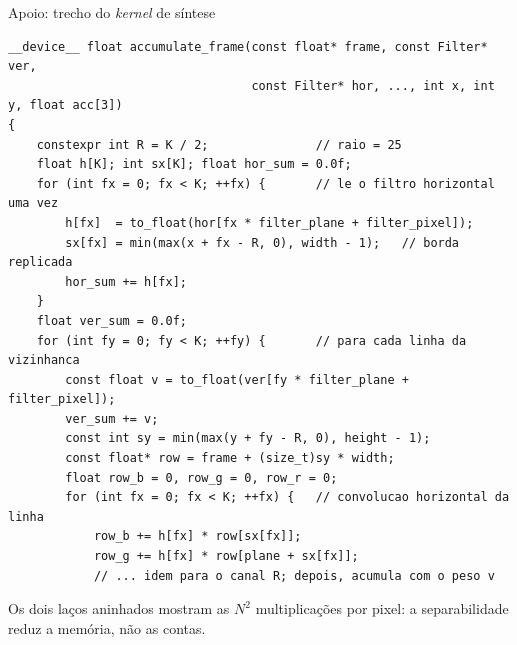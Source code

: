 \documentclass[
    aspectratio=169,
    12pt,
    brazil,
    xcolor=table
]{beamer}
\begin{document}
\begin{frame}[fragile]{Apoio: trecho do \textit{kernel} de síntese}
\tiny
\begin{verbatim}
__device__ float accumulate_frame(const float* frame, const Filter* ver,
                                  const Filter* hor, ..., int x, int y, float acc[3])
{
    constexpr int R = K / 2;               // raio = 25
    float h[K]; int sx[K]; float hor_sum = 0.0f;
    for (int fx = 0; fx < K; ++fx) {       // le o filtro horizontal uma vez
        h[fx]  = to_float(hor[fx * filter_plane + filter_pixel]);
        sx[fx] = min(max(x + fx - R, 0), width - 1);   // borda replicada
        hor_sum += h[fx];
    }
    float ver_sum = 0.0f;
    for (int fy = 0; fy < K; ++fy) {       // para cada linha da vizinhanca
        const float v = to_float(ver[fy * filter_plane + filter_pixel]);
        ver_sum += v;
        const int sy = min(max(y + fy - R, 0), height - 1);
        const float* row = frame + (size_t)sy * width;
        float row_b = 0, row_g = 0, row_r = 0;
        for (int fx = 0; fx < K; ++fx) {   // convolucao horizontal da linha
            row_b += h[fx] * row[sx[fx]];
            row_g += h[fx] * row[plane + sx[fx]];
            // ... idem para o canal R; depois, acumula com o peso v
\end{verbatim}
\normalsize
\vspace{-4pt}
Os dois laços aninhados mostram as $N^2$ multiplicações por pixel: a separabilidade reduz a memória, não as contas.
\end{frame}
\end{document}
